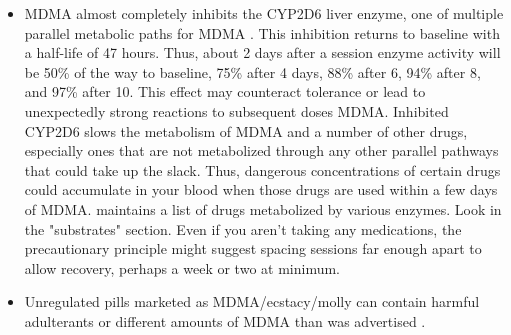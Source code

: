 \documentclass[12pt,letterpaper]{book}
\begin{document}
\begin{itemize}
    \item MDMA almost completely inhibits the CYP2D6 liver enzyme, one of multiple parallel metabolic paths for MDMA \cite{omathunaCYP}. This inhibition returns to baseline with a half-life of 47 hours. Thus, about 2 days after a session enzyme activity will be 50\% of the way to baseline, 75\% after 4 days, 88\% after 6, 94\% after 8, and 97\% after 10. This effect may counteract tolerance or lead to unexpectedly strong reactions to subsequent doses MDMA. Inhibited CYP2D6 slows the metabolism of MDMA and a number of other drugs, especially ones that are not metabolized through any other parallel pathways that could take up the slack. Thus, dangerous concentrations of certain drugs could accumulate in your blood when those drugs are used within a few days of MDMA. \textcite{flockartTable} maintains a list of drugs metabolized by various enzymes. Look in the "substrates" section. Even if you aren't taking any medications, the precautionary principle might suggest spacing sessions far enough apart to allow recovery, perhaps a week or two at minimum.
    \item Unregulated pills marketed as MDMA/ecstacy/molly can contain harmful adulterants or different amounts of MDMA than was advertised \cite{saleemiAdulterants}.
\end{itemize}
\end{document}
